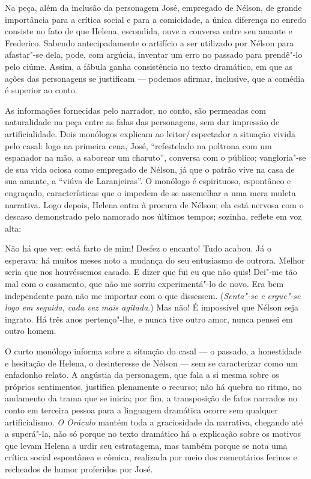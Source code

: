 Na peça, além da inclusão da personagem José, empregado de Nélson, de
grande importância para a crítica social e para a comicidade, a única
diferença no enredo consiste no fato de que Helena, escondida, ouve a
conversa entre seu amante e Frederico. Sabendo antecipadamente o
artifício a ser utilizado por Nélson para afastar"-se dela, pode, com
argúcia, inventar um erro no passado para prendê"-lo pelo ciúme. Assim,
a fábula ganha consistência no texto dramático, em que as ações das
personagens se justificam --- podemos afirmar, inclusive, que a comédia é
superior ao conto. 

As informações fornecidas pelo narrador, no conto, são permeadas com
naturalidade na peça entre as falas das personagens, sem dar impressão
de artificialidade. Dois monólogos explicam ao leitor/\,espectador a
situação vivida pelo casal: logo na primeira cena, José, “refestelado
na poltrona com um espanador na mão, a saborear um charuto”, conversa
com o público; vangloria"-se de sua vida ociosa como empregado de
Nélson, já que o patrão vive na casa de sua amante, a “viúva de
Laranjeiras”. O monólogo é espirituoso, espontâneo e engraçado,
características que o impedem de se assemelhar a uma mera muleta
narrativa. Logo depois, Helena entra à procura de Nélson; ela está
nervosa com o descaso demonstrado pelo namorado nos últimos tempos;
sozinha, reflete em voz alta:

\begin{hedraquote} 
 Não há que ver: está farto de mim! Desfez o encanto! Tudo
acabou. Já o esperava: há muitos meses noto a mudança do seu entusiasmo
de outrora. Melhor seria que nos houvéssemos casado. E dizer que fui eu
que não quis! Dei"-me tão mal com o casamento, que não me sorriu
experimentá"-lo de novo. Era bem independente para não me importar com o
que dissessem. (\textit{Senta"-se e ergue"-se logo em seguida, cada vez
mais agitada}.) Mas não! É impossível que Nélson seja ingrato. Há três
anos pertenço"-lhe, e nunca tive outro amor, nunca pensei em outro
homem.
\end{hedraquote} 

O curto monólogo informa sobre a situação do casal --- o passado, a
honestidade e hesitação de Helena, o desinteresse de Nélson --- sem se
caracterizar como um enfadonho relato. A angústia da personagem, que
fala a si mesma sobre os próprios sentimentos, justifica plenamente o
recurso; não há quebra no ritmo, no andamento da trama que se inicia;
por fim, a transposição de fatos narrados no conto em terceira pessoa
para a linguagem dramática ocorre sem qualquer artificialismo.
\textit{O Oráculo} mantém toda a graciosidade da narrativa, chegando
até a superá"-la, não só porque no texto dramático há a explicação sobre
os motivos que levam Helena a urdir seu estratagema, mas também porque
se nota uma crítica social espontânea e cômica, realizada por meio dos
comentários ferinos e recheados de humor proferidos por José.


